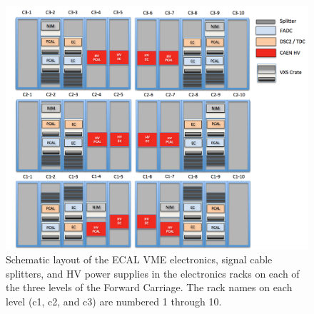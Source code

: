 \documentclass[letterpaper,10pt]{article}
\begin{document}
\begin{figure}[htbp]
  \centering
  \includegraphics[width= 7in, keepaspectratio = true]{FC-EC-rack-layout}
  \vspace{2mm}
  \caption{Schematic layout of the ECAL VME electronics, signal cable splitters, and HV power 
  supplies in the electronics racks on each of the three levels of the Forward Carriage. The rack names on each level (c1, c2,
  and c3) are numbered 1 through 10.}
  \label{fc-layout-1} 
\end{figure}
\end{document}
